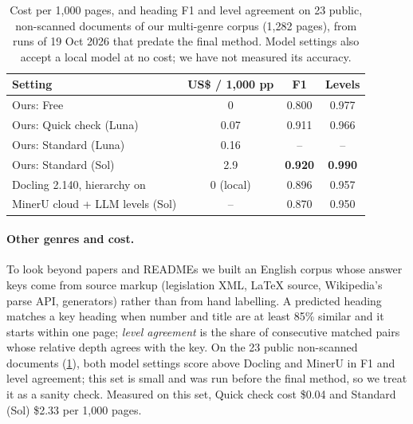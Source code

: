 \documentclass[10pt,twocolumn,letterpaper]{article}
\newcommand{\na}{--}
\begin{document}
\begin{table}[t]
\centering
\footnotesize
\setlength{\tabcolsep}{4pt}
\begin{tabular}{@{}lccc@{}}
\toprule
Setting & US\$ / 1,000 pp & F1 & Levels \\
\midrule
Ours: Free                     & 0    & 0.800 & 0.977 \\
Ours: Quick check (Luna)       & 0.07 & 0.911 & 0.966 \\
Ours: Standard (Luna)          & 0.16 & \na   & \na \\
Ours: Standard (Sol)           & 2.9  & \textbf{0.920} & \textbf{0.990} \\
Docling 2.140, hierarchy on    & 0 (local) & 0.896 & 0.957 \\
MinerU cloud + LLM levels (Sol) & \na & 0.870 & 0.950 \\
\bottomrule
\end{tabular}
\caption{Cost per 1,000 pages, and heading F1 and level agreement on 23 public, non-scanned documents
of our multi-genre corpus (1,282 pages), from runs of 19 Oct 2026 that predate the final method. Model
settings also accept a local model at no cost; we have not measured its accuracy.}
\label{tab:cost}
\end{table}

\paragraph{Other genres and cost.} To look beyond papers and READMEs we built an English corpus whose
answer keys come from source markup (legislation XML, \LaTeX{} source, Wikipedia's parse API,
generators) rather than from hand labelling. A predicted heading matches a key heading when number
and title are at least 85\% similar and it starts within one page; \emph{level agreement} is the share
of consecutive matched pairs whose relative depth agrees with the key. On the 23 public non-scanned
documents (\cref{tab:cost}), both model settings score above Docling and MinerU in F1 and level
agreement; this set is small and was run before the final method, so we treat it as a sanity check. Measured on
this set, Quick check cost \$0.04 and Standard (Sol) \$2.33 per 1,000 pages.
\end{document}

